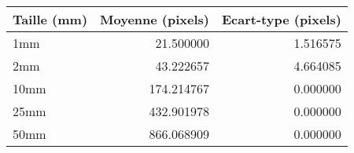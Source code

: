 \begin{tabular}{lrr}
\toprule
Taille (mm) & Moyenne (pixels) & Ecart-type (pixels) \\
\midrule
1mm & 21.500000 & 1.516575 \\
2mm & 43.222657 & 4.664085 \\
10mm & 174.214767 & 0.000000 \\
25mm & 432.901978 & 0.000000 \\
50mm & 866.068909 & 0.000000 \\
\bottomrule
\end{tabular}
